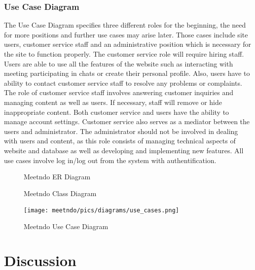 \documentclass[conference]{IEEEtran}
\begin{document}
\subsubsection{Use Case Diagram}

The Use Case Diagram specifies three different roles for the beginning, the need for more positions and further use cases may arise later. Those cases include site users, customer service staff and an administrative position which is necessary for the site to function properly. The customer service role will require hiring staff. Users are able to use all the features of the website such as interacting with meeting participating in chats or create their personal profile. Also, users have to ability to contact customer service staff to resolve any problems or complaints. The role of customer service staff involves answering customer inquiries and managing content as well as users. If necessary, staff will remove or hide inappropriate content. Both customer service and users have the ability to manage account settings. Customer service also serves as a mediator between the users and administrator. The administrator should not be involved in dealing with users and content, as this role consists of managing technical aspects of website and database as well as developing and implementing new features. 
All use cases involve log in/log out from the system with authentification.

\clearpage
\begin{figure}[h!]
  \centering
  \caption { Meetndo ER Diagram}
\end{figure}


\begin{figure}[h!]
  \centering
  \caption { Meetndo Class Diagram}
\end{figure}

\clearpage
\begin{figure}[h!]
  \centering
  \texttt{[image: meetndo/pics/diagrams/use\_cases.png]}
  \caption { Meetndo Use Case Diagram}
\end{figure}

\clearpage
\section{Discussion}
\end{document}
